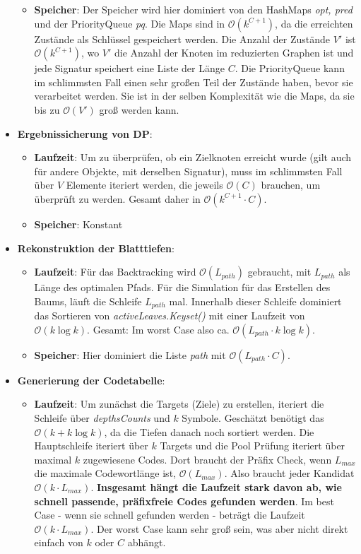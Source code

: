 \documentclass[a4paper,10pt,ngerman]{scrartcl}
\begin{document}
\begin{itemize}
\begin{itemize}
    \item \textbf{Speicher}:
    Der Speicher wird hier dominiert von den HashMaps \textit{opt, pred} und der PriorityQueue \textit{pq}. Die Maps sind in $\mathcal{O}(k^{C+1})$, da die erreichten Zustände als Schlüssel gespeichert werden. Die Anzahl der Zustände $V'$ ist $\mathcal{O}(k^{C+1})$, wo $V'$ die Anzahl der Knoten im reduzierten Graphen ist und jede Signatur speichert eine Liste der Länge $C$. Die PriorityQueue kann im schlimmsten Fall einen sehr großen Teil der Zustände haben, bevor sie verarbeitet werden. Sie ist in der selben Komplexität wie die Maps, da sie bis zu $\mathcal{O}(V')$ groß werden kann.
  \end{itemize}
  \item \textbf{Ergebnissicherung von DP}:
  \begin{itemize}
    \item \textbf{Laufzeit}:
    Um zu überprüfen, ob ein Zielknoten erreicht wurde (gilt auch für andere Objekte, mit derselben Signatur), muss im schlimmsten Fall über $V$ Elemente iteriert werden, die jeweils $\mathcal{O}(C)$ brauchen, um überprüft zu werden. Gesamt daher in $\mathcal{O}(k^{C+1} \cdot C)$.
    \item \textbf{Speicher}: Konstant
  \end{itemize}
  \item \textbf{Rekonstruktion der Blatttiefen}:
  \begin{itemize}
    \item \textbf{Laufzeit}:
    Für das Backtracking wird $\mathcal{O}(L_{path})$ gebraucht, mit $L_{path}$ als Länge des optimalen Pfads. Für die Simulation für das Erstellen des Baums, läuft die Schleife $L_{path}$ mal. Innerhalb dieser Schleife dominiert das Sortieren von \textit{activeLeaves.Keyset()} mit einer Laufzeit von $\mathcal{O}(k \log k)$. Gesamt: Im worst Case also ca. $\mathcal{O}(L_{path}\cdot k \log k)$.
    \item \textbf{Speicher}:
    Hier dominiert die Liste \textit{path} mit $\mathcal{O}(L_{path} \cdot C)$.
  \end{itemize}
  \item \textbf{Generierung der Codetabelle}:
  \begin{itemize}
    \item \textbf{Laufzeit}:
    Um zunächst die Targets (Ziele) zu erstellen, iteriert die Schleife über \textit{depthsCounts} und $k$ Symbole. Geschätzt benötigt das $\mathcal{O}(k+ k\log k)$, da die Tiefen danach noch sortiert werden. Die Hauptschleife iteriert über $k$ Targets und die Pool Prüfung iteriert über maximal $k$ zugewiesene Codes. Dort braucht der Präfix Check, wenn $L_{max}$ die maximale Codewortlänge ist, $\mathcal{O}(L_{max})$. Also braucht jeder Kandidat $\mathcal{O}(k\cdot L_{max})$. \textbf{Insgesamt hängt die Laufzeit stark davon ab, wie schnell passende, präfixfreie Codes gefunden werden}. Im best Case - wenn sie schnell gefunden werden - beträgt die Laufzeit $\mathcal{O}(k\cdot L_{max})$. Der worst Case kann sehr groß sein, was aber nicht direkt einfach von $k$ oder $C$ abhängt.

\end{itemize}
\end{itemize}
\end{document}
